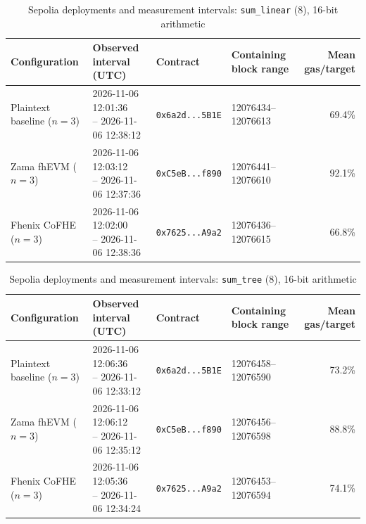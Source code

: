 \begin{table}[!t]
\caption{Sepolia deployments and measurement intervals: \texttt{sum\_linear} (8), 16-bit arithmetic}
\label{tab:sepolia-experiment-deployments-circuits-euint16-circuits-w16-sum-linear-n8}
\centering
\footnotesize
\setlength{\tabcolsep}{4pt}
\begin{tabular}{|l|l|l|l|r|}
\hline
\textbf{Configuration} &
\textbf{Observed interval (UTC)} &
\textbf{Contract} &
\textbf{Containing block range} &
\textbf{Mean gas/target} \\
\hline
Plaintext baseline (\(n=3\)) &
\shortstack[l]{2026-11-06 12:01:36 \\ -- 2026-11-06 12:38:12} &
\texttt{0x6a2d...5B1E} &
12076434--12076613 &
69.4\% \\
\hline
Zama fhEVM (\(n=3\)) &
\shortstack[l]{2026-11-06 12:03:12 \\ -- 2026-11-06 12:37:36} &
\texttt{0xC5eB...f890} &
12076441--12076610 &
92.1\% \\
\hline
Fhenix CoFHE (\(n=3\)) &
\shortstack[l]{2026-11-06 12:02:00 \\ -- 2026-11-06 12:38:36} &
\texttt{0x7625...A9a2} &
12076436--12076615 &
66.8\% \\
\hline
\end{tabular}
\end{table}

\begin{table}[!t]
\caption{Sepolia deployments and measurement intervals: \texttt{sum\_tree} (8), 16-bit arithmetic}
\label{tab:sepolia-experiment-deployments-circuits-euint16-circuits-w16-sum-tree-n8}
\centering
\footnotesize
\setlength{\tabcolsep}{4pt}
\begin{tabular}{|l|l|l|l|r|}
\hline
\textbf{Configuration} &
\textbf{Observed interval (UTC)} &
\textbf{Contract} &
\textbf{Containing block range} &
\textbf{Mean gas/target} \\
\hline
Plaintext baseline (\(n=3\)) &
\shortstack[l]{2026-11-06 12:06:36 \\ -- 2026-11-06 12:33:12} &
\texttt{0x6a2d...5B1E} &
12076458--12076590 &
73.2\% \\
\hline
Zama fhEVM (\(n=3\)) &
\shortstack[l]{2026-11-06 12:06:12 \\ -- 2026-11-06 12:35:12} &
\texttt{0xC5eB...f890} &
12076456--12076598 &
88.8\% \\
\hline
Fhenix CoFHE (\(n=3\)) &
\shortstack[l]{2026-11-06 12:05:36 \\ -- 2026-11-06 12:34:24} &
\texttt{0x7625...A9a2} &
12076453--12076594 &
74.1\% \\
\hline
\end{tabular}
\end{table}

